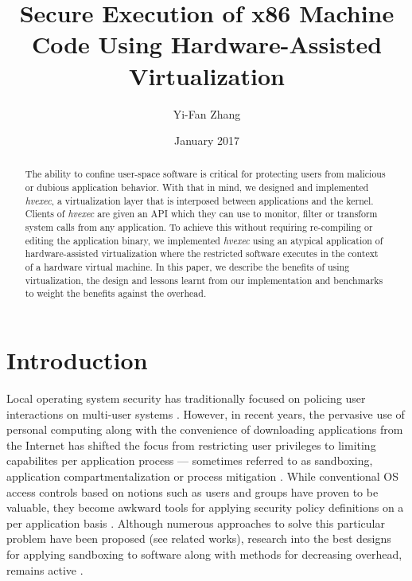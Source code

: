 \documentclass{article}
\title{Secure Execution of x86 Machine Code Using Hardware-Assisted Virtualization}
\author{Yi-Fan Zhang}
\date{January 2017}
\newcommand{\PROJNAME}{\textit{hvexec}}
\begin{document}
\maketitle

\begin{abstract}
The ability to confine user-space software is critical for protecting users from
malicious or dubious application behavior.
With that in mind, we designed and implemented \PROJNAME{}, a virtualization layer that is interposed between applications and the kernel. Clients of \PROJNAME{} are given an API which they can use to monitor, filter or transform system calls from any application. To achieve this without requiring re-compiling or editing the application binary, we implemented \PROJNAME{} using an atypical application of hardware-assisted virtualization
where the restricted software executes in the context of a hardware virtual machine.
In this paper, we describe the benefits of using virtualization, the design and lessons learnt from our implementation and benchmarks to 
weight the benefits against the overhead.
\end{abstract}

\section{Introduction}
Local operating system security has traditionally focused on policing user interactions on multi-user systems \cite{DesignImplFreeBSD}.
However, in recent years, the pervasive use of personal computing along with the convenience of downloading
applications from the Internet has shifted the focus from restricting user privileges to limiting capabilites per application process
— sometimes referred to as sandboxing, application compartmentalization or process mitigation \cite{DesignImplFreeBSD}.
While conventional OS access controls based on notions such as users and groups have proven to be valuable,
they become awkward tools for applying security policy definitions on a per application basis \cite{DesignImplFreeBSD}.
Although numerous approaches to solve this particular problem have been proposed (see related works),
research into the best designs for applying sandboxing to software along with methods for decreasing overhead, remains active \cite{Ayer2012,VCall2010,DesignImplFreeBSD}.
\end{document}
